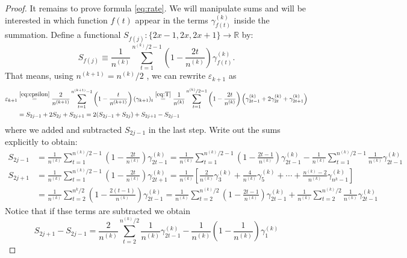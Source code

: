 \documentclass[11pt,english,a4paper]{article}
\begin{document}
\begin{proof}
It remains to prove formula \eqref{eq:rate}. We will manipulate sums and will be interested in which function $f(t)$ appear in the terms $\gamma^{(k)}_{f(t)}$ inside the summation. Define a functional $S_{f(j)} : \{2x-1,2x,2x+1\} \to \mathbb{R}$ by: 
\[S_{f(j)} \equiv \frac{1}{n^{(k)}} \sum_{t=1}^{n^{(k)}/2-1} \left( 1 - \frac{2t}{n^{(k)}} \right) \gamma^{(k)}_{f(t)}. \]
That means, using $n^{(k+1)} = n^{(k)}/2$ , we can rewrite $\varepsilon_{  k+1}$ as
\begin{align}
\varepsilon_{  k+1} &\stackrel{\eqref{eq:epsilon}}{=} \frac{2}{n^{(k+1)}} \sum_{t=1}^{n^{(k+1)}-1} \left( 1 - \frac{t}{n^{(k+1)}} \right) (\gamma_{k+1})_t \stackrel{\eqref{eq:T}}{=} \frac{1}{n^{(k)}} \sum_{t=1}^{n^{(k)}/2-1} \left( 1 - \frac{2t}{n^{(k)}} \right) \left( \gamma^{(k)}_{2t - 1} + 2\gamma^{(k)}_{2t} + \gamma^{(k)}_{2t + 1}\right) \nonumber \\
&= S_{2j-1} + 2S_{2j} + S_{2j+1} = 2(S_{2j-1} + S_{2j}) + S_{2j+1} - S_{2j-1} \label{eq:epsilonkpp}
\end{align}
where we added and subtracted $S_{2j - 1}$ in the last step. Write out the sums explicitly to obtain:
\begin{align}
S_{2j-1} &= \frac{1}{n^{(k)}} \sum_{t=1}^{n^{(k)}/2-1} \left( 1 - \frac{2t}{n^{(k)}} \right) \gamma^{(k)}_{2t - 1}  = \frac{1}{n^{(k)}}\sum_{t=1}^{n^{(k)}/2-1} \left( 1 - \frac{2t-1}{n^{(k)}}\right) \gamma^{(k)}_{2t - 1} - \frac{1}{n^{(k)}} \sum_{t=1}^{n^{(k)}/2-1} \frac{1}{n^{(k)}} \gamma^{(k)}_{2t - 1} \label{eq:sumB}
\\
S_{2j+1} &= \frac{1}{n^{(k)}} \sum_{t=1}^{n^{(k)}/2-1} \left( 1 - \frac{2t}{n^{(k)}} \right) \gamma^{(k)}_{2t + 1}  = \frac{1}{n^{(k)}} \left[ \frac{2}{n^{(k)}} \gamma^{(k)}_{3} + \frac{4}{n^{(k)}} \gamma^{(k)}_{5} + \cdots + \frac{n^{(k)} - 2}{n^{(k)}} \gamma^{(k)}_{n^{k} - 1}\right]\nonumber
 \\
 &= \frac{1}{n^{(k)}}\sum_{t=2}^{n^{k}/2} \left( 1 - \frac{2(t-1)}{n^{(k)}} \right) \gamma^{(k)}_{2t-1} = \frac{1}{n^{(k)}} \sum_{t=2}^{n^{(k)}/2} \left( 1 - \frac{2t-1}{n^{(k)}} \right) \gamma^{(k)}_{2t - 1} + \frac{1}{n^{(k)}}\sum_{t=2}^{n^{(k)}/2} \frac{1}{n^{(k)}} \gamma^{(k)}_{2t - 1}  \nonumber
\end{align}
Notice that if thse terms are subtracted we obtain
\begin{equation}
S_{2j+1} - S_{2j-1} = \frac{2}{n^{(k)}} \sum_{t=2}^{n^{(k)}/2} \frac{1}{n^{(k)}} \gamma^{(k)}_{2t - 1} - \frac{1}{n^{(k)}}\left( 1 - \frac{1}{n^{(k)}} \right) \gamma^{(k)}_{1} \label{eq:differencesum}

\end{equation}
\end{proof}
\end{document}
